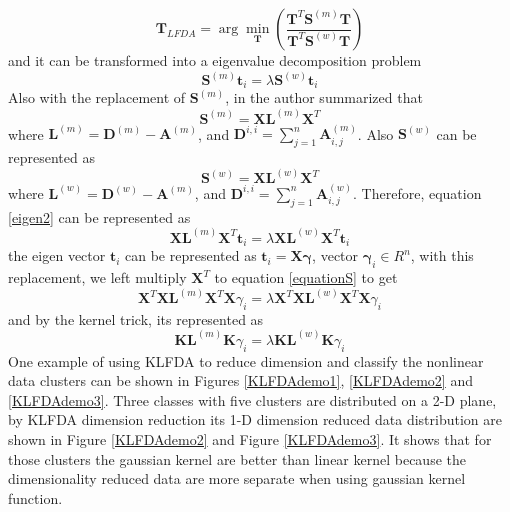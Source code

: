 \begin{equation}
\bm{T}_{LFDA}  = \arg\min_{\bm{T}} (\frac{\bm{T}^T\bm{S}^{(m)}\bm{T}}{\bm{T}^T\bm{S}^{(w)}\bm{T}})
\end{equation}
and it can be transformed into a eigenvalue decomposition problem 
\begin{equation}\label{eigen2}
\bm{S}^{(m)}\bm{t}_i  = \lambda \bm{S}^{(w)}\bm{t}_i
\end{equation}
Also with the replacement of $\bm{S}^{(m)}$, in \cite{KLFDA} the author summarized that 
\begin{equation}
\bm{S}^{(m)} = \bm{X}\bm{L}^{(m)}\bm{X}^T
\end{equation}
where $\bm{L}^{(m)}  = \bm{D}^{(m)} - \bm{A}^{(m)}$, and $ \bm{D}^{i,i} = \sum_{j=1}^n  \bm{A}_{i,j}^{(m)}$. Also $\bm{S}^{(w)}$ can be represented as 
\begin{equation}
\bm{S}^{(w)} = \bm{X}\bm{L}^{(w)}\bm{X}^T
\end{equation}
where $\bm{L}^{(w)}  = \bm{D}^{(w)} - \bm{A}^{(m)}$, and $ \bm{D}^{i,i} = \sum_{j=1}^n  \bm{A}_{i,j}^{(w)}$. 
Therefore, equation \ref{eigen2} can be represented as
\begin{equation}\label{equationS}
\bm{X}\bm{L}^{(m)}\bm{X}^T \bm{t}_i= \lambda\bm{X}\bm{L}^{(w)}\bm{X}^T \bm{t}_i
\end{equation}
the eigen vector $\bm{t}_i$  can be represented as $\bm{t}_i = \bm{X}\bm{\gamma}$, vector $\bm{\gamma}_i \in R^n$, with this replacement, we left multiply $\bm{X}^T$ to equation \ref{equationS} to get 
\begin{equation}
\bm{X}^T\bm{X}\bm{L}^{(m)}\bm{X}^T\bm{X}\gamma_i = \lambda\bm{X}^T\bm{X}\bm{L}^{(w)}\bm{X}^T \bm{X}\gamma_i
\end{equation}
and by the kernel trick, its represented as
\begin{equation}
\bm{K}\bm{L}^{(m)}\bm{K}\gamma_i  = \lambda \bm{K}\bm{L}^{(w)}\bm{K}\gamma_i
\end{equation}
One example of using KLFDA to reduce dimension and classify the nonlinear data clusters can be shown in Figures \ref{KLFDAdemo1}, \ref{KLFDAdemo2} and \ref{KLFDAdemo3}. Three classes with five clusters are distributed on a 2-D plane, by KLFDA dimension reduction its 1-D dimension reduced data distribution are shown in Figure \ref{KLFDAdemo2} and Figure \ref{KLFDAdemo3}. It shows that for those clusters the gaussian kernel are better than linear kernel because the dimensionality reduced data are more separate when using gaussian kernel function.

